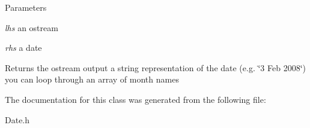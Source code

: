 \begin{DoxyParams}{Parameters}
\item[{\em lhs}]an ostream \item[{\em rhs}]a date \end{DoxyParams}
\begin{DoxyReturn}{Returns}
the ostream output a string representation of the date (e.g. \char`\"{}3 Feb 2008\char`\"{}) you can loop through an array of month names 
\end{DoxyReturn}


The documentation for this class was generated from the following file:\begin{DoxyCompactItemize}
\item 
Date.h\end{DoxyCompactItemize}
